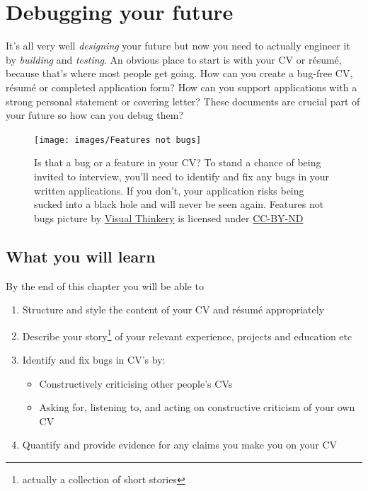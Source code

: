 \documentclass[
]{book}
\providecommand{\tightlist}{%
  \setlength{\itemsep}{0pt}\setlength{\parskip}{0pt}}
\begin{document}
\hypertarget{debugging}{%
\chapter{Debugging your future}\label{debugging}}

It's all very well \emph{designing} your future but now you need to actually engineer it by \emph{building} and \emph{testing}. An obvious place to start is with your CV or résumé, because that's where most people get going. How can you create a bug-free CV, résumé or completed application form? How can you support applications with a strong personal statement or covering letter? These documents are crucial part of your future so how can you debug them? 🐛

\begin{figure}

{\centering \texttt{[image: images/Features not bugs]} 

}

\caption{Is that a bug or a feature in your CV? To stand a chance of being invited to interview, you'll need to identify and fix any bugs in your written applications. If you don't, your application risks being sucked into a black hole and will never be seen again. Features not bugs picture by \href{https://visualthinkery.com}{Visual Thinkery} is licensed under \href{https://creativecommons.org/licenses/by-nd/4.0/}{CC-BY-ND}}\label{fig:bugfeature-fig}
\end{figure}



\hypertarget{ilo7}{%
\section{What you will learn}\label{ilo7}}

By the end of this chapter you will be able to

\begin{enumerate}
\def\labelenumi{\arabic{enumi}.}
\tightlist
\item
  Structure and style the content of your CV and résumé appropriately
\item
  Describe your story\footnote{actually a collection of short stories} of your relevant experience, projects and education etc
\item
  Identify and fix bugs in CV's by:

  \begin{itemize}
  \tightlist
  \item
    Constructively criticising other people's CVs
  \item
    Asking for, listening to, and acting on constructive criticism of your own CV
  \end{itemize}
\item
  Quantify and provide evidence for any claims you make you on your CV
\end{enumerate}
\end{document}
